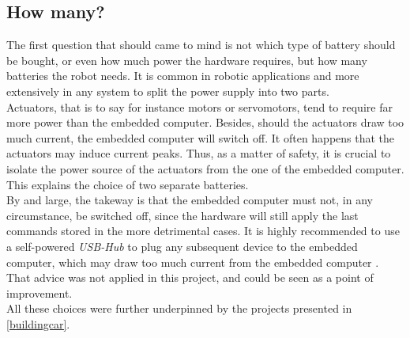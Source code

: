 		\subsection{How many?}
		The first question that should came to mind is not which type of battery
		should be bought, or even
		how much power the hardware requires, but how many batteries the robot 
		needs. It is common in robotic applications and more 
		extensively in any system to split the power supply into two parts.\cite{racecarj} 
		\\\indent Actuators, that is to say for instance motors
		or servomotors, tend to require far more power than the embedded computer. Besides, 
		should the actuators draw too much current, the embedded computer will switch off.
		It often happens that the actuators may induce current peaks. Thus, 
		as a matter of safety, it is crucial to isolate the power source of the actuators
		from the one of the embedded computer. This explains the choice of two separate 
		batteries.
		\\\indent By and large, the takeway is that the embedded computer must not, 
		in any circumstance, be switched off, since the hardware will still 
		apply the last commands stored in the more detrimental cases. It is 
		highly recommended to use a self-powered \textit{USB-Hub}
		to plug any subsequent device to the embedded computer, which 
		may draw too much current from the embedded computer \cite{racecarj}.
		That advice was not applied in this project, and could be
		seen as a point of improvement.
		\\\indent All these choices were further underpinned by 
		the projects presented in \vref{buildingcar}.
		
